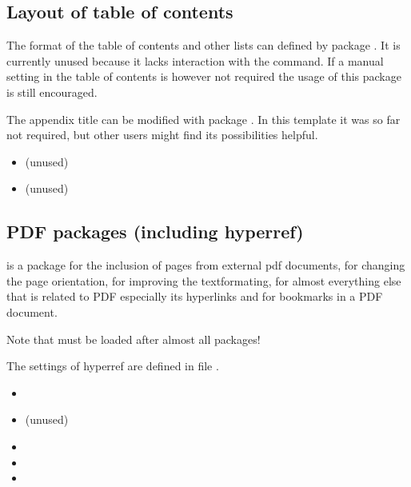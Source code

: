 \subsection{Layout of table of contents}

The format of the table of contents and other lists can defined by package . It is currently unused because it lacks interaction with the  command. If a manual setting in the table of contents is however not required the usage of this package is still encouraged.

The appendix title can be modified with package . In this template it was so far not required, but other users might find its possibilities helpful.

\begin{itemize}[noitemsep]
\item {} (unused)
\item {} (unused)
\end{itemize}


\subsection{PDF packages (including hyperref)}

 is a package for the inclusion of pages from external pdf documents,
 for changing the page orientation,
 for improving the textformating,
 for almost everything else that is related to PDF especially its hyperlinks and 
 for bookmarks in a PDF document.

Note that  must be loaded after almost all packages!

The settings of hyperref are defined in file 
.

\begin{itemize}[noitemsep]
\item {}
\item {} (unused)
\item {}
\item {}
\item {}
\end{itemize}

